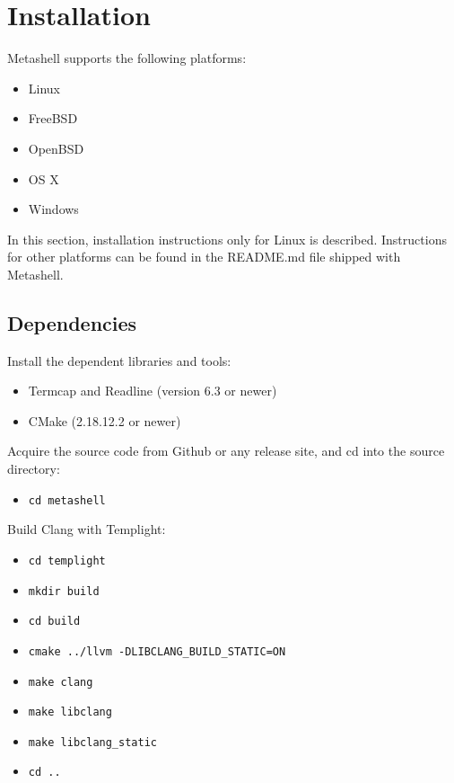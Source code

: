 
\section{Installation}

Metashell supports the following platforms:
\begin{itemize}
    \item Linux
    \item FreeBSD
    \item OpenBSD
    \item OS X
    \item Windows
\end{itemize}

In this section, installation instructions only for Linux is described.
Instructions for other platforms can be found in the README.md file shipped
with Metashell.

\subsection{Dependencies}

Install the dependent libraries and tools:

\begin{itemize}
    \item Termcap and Readline (version 6.3 or newer)
    \item CMake (2.18.12.2 or newer)
\end{itemize}

Acquire the source code from Github\cite{github} or any release site, and cd
into the source directory:

\begin{itemize}
    \item \texttt{cd metashell}
\end{itemize}

Build Clang with Templight\cite{templight}:

\begin{itemize}
    \item \texttt{cd templight}
    \item \texttt{mkdir build}
    \item \texttt{cd build}
    \item \texttt{cmake ../llvm -DLIBCLANG\_BUILD\_STATIC=ON}
    \item \texttt{make clang}
    \item \texttt{make libclang}
    \item \texttt{make libclang\_static}
    \item \texttt{cd ..}
\end{itemize}

